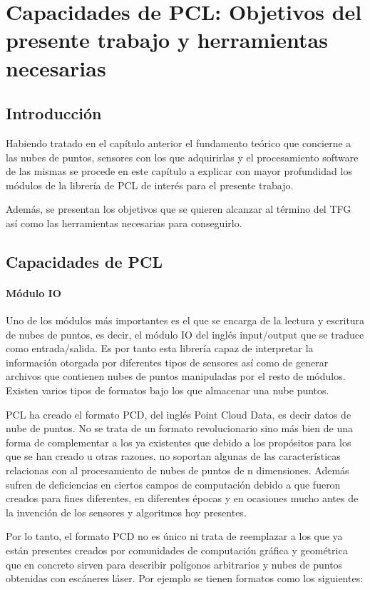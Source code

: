 \chapter{Capacidades de PCL: Objetivos del presente trabajo y herramientas necesarias}

\section{Introducción}
Habiendo tratado en el capítulo anterior el fundamento teórico que concierne a las nubes de puntos, sensores con los que adquirirlas y el procesamiento software de las mismas se procede en este capítulo a explicar con mayor profundidad los módulos de la librería de PCL de interés para el presente trabajo.

Además, se presentan los objetivos que se quieren alcanzar al término del TFG así como las herramientas necesarias para conseguirlo.

\section{Capacidades de PCL}
\subsubsection{Módulo IO}
Uno de los módulos más importantes es el que se encarga de la lectura y escritura de nubes de puntos, es decir, el módulo IO del inglés input/output que se traduce como entrada/salida. Es por tanto esta librería capaz de interpretar la información otorgada por diferentes tipos de sensores así como de generar archivos que contienen nubes de puntos manipuladas por el resto de módulos.
Existen varios tipos de formatos bajo los que almacenar una nube puntos.

PCL ha creado el formato PCD, del inglés Point Cloud Data, es decir datos de nube de puntos. No se trata de un formato revolucionario sino más bien de una forma de complementar a los ya existentes que debido a los propósitos para los que se han creado u otras razones, no soportan algunas de las características relacionas con al procesamiento de nubes de puntos de n dimensiones. Además sufren de deficiencias en ciertos campos de computación debido a que fueron creados para fines diferentes, en diferentes épocas y en ocasiones mucho antes de la invención de los sensores y algoritmos hoy presentes.

Por lo tanto, el formato PCD no es único ni trata de reemplazar a los que ya están presentes creados por comunidades de computación gráfica y geométrica que en concreto sirven para describir polígonos arbitrarios y nubes de puntos obtenidas con escáneres láser. Por ejemplo se tienen formatos como los siguientes:


